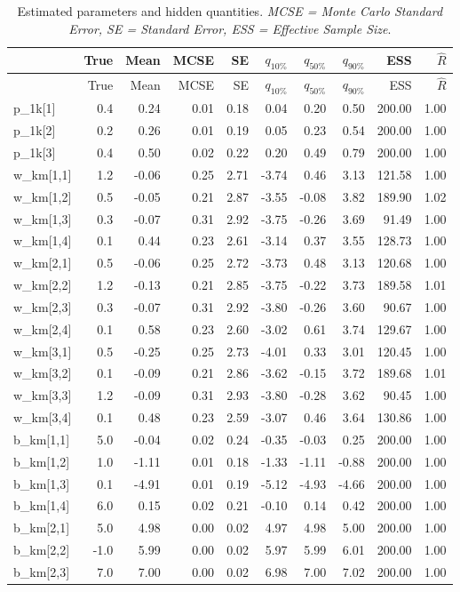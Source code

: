 \documentclass[]{article}
\begin{document}
{{{\begin{longtable}[]{@{}lrrrrrrrrr@{}}
\caption{Estimated parameters and hidden quantities. \emph{MCSE = Monte
Carlo Standard Error, SE = Standard Error, ESS = Effective Sample
Size}.}\tabularnewline
\toprule
& True & Mean & MCSE & SE & \(q_{10\%}\) & \(q_{50\%}\) & \(q_{90\%}\) &
ESS & \(\hat{R}\)\tabularnewline
\midrule
\endfirsthead
\toprule
& True & Mean & MCSE & SE & \(q_{10\%}\) & \(q_{50\%}\) & \(q_{90\%}\) &
ESS & \(\hat{R}\)\tabularnewline
\midrule
\endhead
p\_1k{[}1{]} & 0.4 & 0.24 & 0.01 & 0.18 & 0.04 & 0.20 & 0.50 & 200.00 &
1.00\tabularnewline
p\_1k{[}2{]} & 0.2 & 0.26 & 0.01 & 0.19 & 0.05 & 0.23 & 0.54 & 200.00 &
1.00\tabularnewline
p\_1k{[}3{]} & 0.4 & 0.50 & 0.02 & 0.22 & 0.20 & 0.49 & 0.79 & 200.00 &
1.00\tabularnewline
w\_km{[}1,1{]} & 1.2 & -0.06 & 0.25 & 2.71 & -3.74 & 0.46 & 3.13 &
121.58 & 1.00\tabularnewline
w\_km{[}1,2{]} & 0.5 & -0.05 & 0.21 & 2.87 & -3.55 & -0.08 & 3.82 &
189.90 & 1.02\tabularnewline
w\_km{[}1,3{]} & 0.3 & -0.07 & 0.31 & 2.92 & -3.75 & -0.26 & 3.69 &
91.49 & 1.00\tabularnewline
w\_km{[}1,4{]} & 0.1 & 0.44 & 0.23 & 2.61 & -3.14 & 0.37 & 3.55 & 128.73
& 1.00\tabularnewline
w\_km{[}2,1{]} & 0.5 & -0.06 & 0.25 & 2.72 & -3.73 & 0.48 & 3.13 &
120.68 & 1.00\tabularnewline
w\_km{[}2,2{]} & 1.2 & -0.13 & 0.21 & 2.85 & -3.75 & -0.22 & 3.73 &
189.58 & 1.01\tabularnewline
w\_km{[}2,3{]} & 0.3 & -0.07 & 0.31 & 2.92 & -3.80 & -0.26 & 3.60 &
90.67 & 1.00\tabularnewline
w\_km{[}2,4{]} & 0.1 & 0.58 & 0.23 & 2.60 & -3.02 & 0.61 & 3.74 & 129.67
& 1.00\tabularnewline
w\_km{[}3,1{]} & 0.5 & -0.25 & 0.25 & 2.73 & -4.01 & 0.33 & 3.01 &
120.45 & 1.00\tabularnewline
w\_km{[}3,2{]} & 0.1 & -0.09 & 0.21 & 2.86 & -3.62 & -0.15 & 3.72 &
189.68 & 1.01\tabularnewline
w\_km{[}3,3{]} & 1.2 & -0.09 & 0.31 & 2.93 & -3.80 & -0.28 & 3.62 &
90.45 & 1.00\tabularnewline
w\_km{[}3,4{]} & 0.1 & 0.48 & 0.23 & 2.59 & -3.07 & 0.46 & 3.64 & 130.86
& 1.00\tabularnewline
b\_km{[}1,1{]} & 5.0 & -0.04 & 0.02 & 0.24 & -0.35 & -0.03 & 0.25 &
200.00 & 1.00\tabularnewline
b\_km{[}1,2{]} & 1.0 & -1.11 & 0.01 & 0.18 & -1.33 & -1.11 & -0.88 &
200.00 & 1.00\tabularnewline
b\_km{[}1,3{]} & 0.1 & -4.91 & 0.01 & 0.19 & -5.12 & -4.93 & -4.66 &
200.00 & 1.00\tabularnewline
b\_km{[}1,4{]} & 6.0 & 0.15 & 0.02 & 0.21 & -0.10 & 0.14 & 0.42 & 200.00
& 1.00\tabularnewline
b\_km{[}2,1{]} & 5.0 & 4.98 & 0.00 & 0.02 & 4.97 & 4.98 & 5.00 & 200.00
& 1.00\tabularnewline
b\_km{[}2,2{]} & -1.0 & 5.99 & 0.00 & 0.02 & 5.97 & 5.99 & 6.01 & 200.00
& 1.00\tabularnewline
b\_km{[}2,3{]} & 7.0 & 7.00 & 0.00 & 0.02 & 6.98 & 7.00 & 7.02 & 200.00
& 1.00\tabularnewline

\end{longtable}}}}
\end{document}
